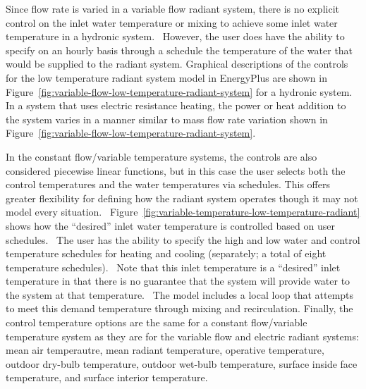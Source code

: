 Since flow rate is varied in a variable flow radiant system, there is no explicit control on the inlet water temperature or mixing to achieve some inlet water temperature in a hydronic system.~ However, the user does have the ability to specify on an hourly basis through a schedule the temperature of the water that would be supplied to the radiant system.  Graphical descriptions of the controls for the low temperature radiant system model in EnergyPlus are shown in Figure~\ref{fig:variable-flow-low-temperature-radiant-system} for a hydronic system.~ In a system that uses electric resistance heating, the power or heat addition to the system varies in a manner similar to mass flow rate variation shown in Figure~\ref{fig:variable-flow-low-temperature-radiant-system}.

In the constant flow/variable temperature systems, the controls are also considered piecewise linear functions, but in this case the user selects both the control temperatures and the water temperatures via schedules.  This offers greater flexibility for defining how the radiant system operates though it may not model every situation.~ Figure~\ref{fig:variable-temperature-low-temperature-radiant} shows how the ``desired'' inlet water temperature is controlled based on user schedules.~ The user has the ability to specify the high and low water and control temperature schedules for heating and cooling (separately; a total of eight temperature schedules).~ Note that this inlet temperature is a ``desired'' inlet temperature in that there is no guarantee that the system will provide water to the system at that temperature.~ The model includes a local loop that attempts to meet this demand temperature through mixing and recirculation.  Finally, the control temperature options are the same for a constant flow/variable temperature system as they are for the variable flow and electric radiant systems: mean air temperautre, mean radiant temperature, operative temperature, outdoor dry-bulb temperature, outdoor wet-bulb temperature, surface inside face temperature, and surface interior temperature.

